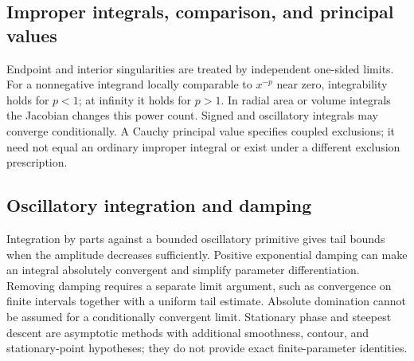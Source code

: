 \documentclass[11pt,oneside,openany]{book}
\begin{document}
\par\addvspace{8pt}\noindent\begin{minipage}{\linewidth}
\subsection{Improper integrals, comparison, and principal values}

Endpoint and interior singularities are treated by independent one-sided limits.
For a nonnegative integrand locally comparable to \(x^{-p}\) near zero,
integrability holds for \(p<1\); at infinity it holds for \(p>1\). In radial area or
volume integrals the Jacobian changes this power count. Signed and oscillatory
integrals may converge conditionally. A Cauchy principal value specifies coupled
exclusions; it need not equal an ordinary improper integral or exist under a
different exclusion prescription.

\end{minipage}\par
\par\addvspace{8pt}\noindent\begin{minipage}{\linewidth}
\subsection{Oscillatory integration and damping}

Integration by parts against a bounded oscillatory primitive gives tail bounds
when the amplitude decreases sufficiently. Positive exponential damping can
make an integral absolutely convergent and simplify parameter differentiation.
Removing damping requires a separate limit argument, such as convergence on
finite intervals together with a uniform tail estimate. Absolute domination
cannot be assumed for a conditionally convergent limit. Stationary phase and
steepest descent are asymptotic methods with additional smoothness, contour,
and stationary-point hypotheses; they do not provide exact finite-parameter
identities.

\end{minipage}\par
\end{document}
